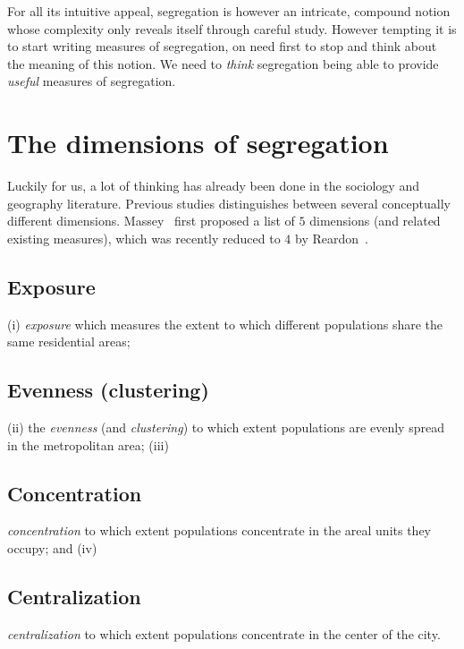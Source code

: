 For all its intuitive appeal, segregation is however an intricate, compound
notion whose complexity only reveals itself through careful study. However
tempting it is to start writing measures of segregation, on need first to stop
and think about the meaning of this notion. We need to \emph{think} segregation
being able to provide \emph{useful} measures of segregation.


\section{The dimensions of segregation}
\label{sec:the_dimensions_of_segregation}

Luckily for us, a lot of thinking has already been done in the sociology and
geography literature. Previous studies distinguishes between several conceptually
different dimensions.  Massey~\cite{Massey:1988} first proposed a list of $5$
dimensions (and related existing measures), which was recently reduced to $4$ by
Reardon~\cite{Reardon:2004}. 

\subsection{Exposure}
\label{sub:exposure}

(i) {\it exposure} which measures the extent to
which different populations share the same residential areas; 

\subsection{Evenness (clustering)}
\label{sub:evenness_clustering_}

(ii) the {\it
evenness} (and {\it clustering}) to which extent populations are evenly spread
in the metropolitan area; (iii) 

\subsection{Concentration}
\label{sub:concentration}

{\it concentration} to which extent populations
concentrate in the areal units they occupy; and (iv) 

\subsection{Centralization}
\label{sub:centralization}

{\it centralization} to
which extent populations concentrate in the center of the city.\\


